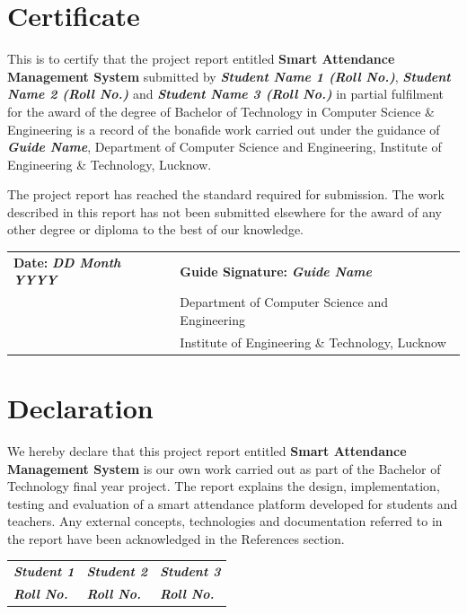 \documentclass[12pt,a4paper,oneside]{report}
\newcommand{\projecttitle}{Smart Attendance Management System}
\newcommand{\placeholder}[1]{\textbf{\textit{#1}}}
\begin{document}


\chapter*{Certificate}
This is to certify that the project report entitled \textbf{\projecttitle} submitted by \placeholder{Student Name 1 (Roll No.)}, \placeholder{Student Name 2 (Roll No.)} and \placeholder{Student Name 3 (Roll No.)} in partial fulfilment for the award of the degree of Bachelor of Technology in Computer Science \& Engineering is a record of the bonafide work carried out under the guidance of \placeholder{Guide Name}, Department of Computer Science and Engineering, Institute of Engineering \& Technology, Lucknow.

\vspace{1cm}
The project report has reached the standard required for submission. The work described in this report has not been submitted elsewhere for the award of any other degree or diploma to the best of our knowledge.

\vspace{2cm}
\begin{tabularx}{\textwidth}{X X}
\textbf{Date:} \placeholder{DD Month YYYY} & \textbf{Guide Signature:} \placeholder{Guide Name}\\
& Department of Computer Science and Engineering\\
& Institute of Engineering \& Technology, Lucknow
\end{tabularx}

\chapter*{Declaration}
We hereby declare that this project report entitled \textbf{\projecttitle} is our own work carried out as part of the Bachelor of Technology final year project. The report explains the design, implementation, testing and evaluation of a smart attendance platform developed for students and teachers. Any external concepts, technologies and documentation referred to in the report have been acknowledged in the References section.

\vspace{2cm}
\begin{tabularx}{\textwidth}{X X X}
\placeholder{Student 1} & \placeholder{Student 2} & \placeholder{Student 3}\\
\placeholder{Roll No.} & \placeholder{Roll No.} & \placeholder{Roll No.}
\end{tabularx}
\end{document}
